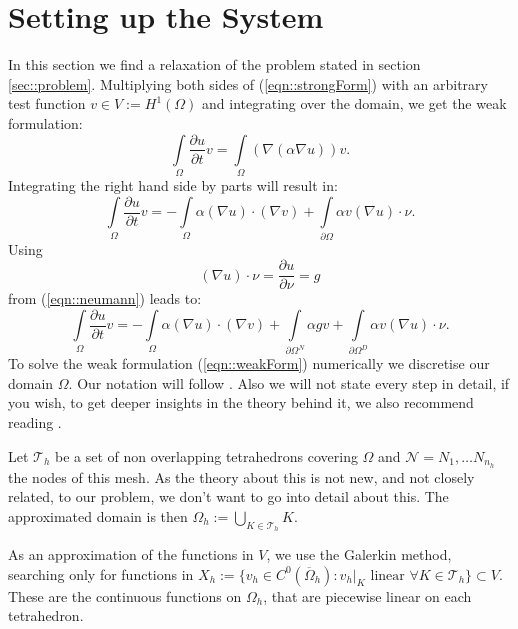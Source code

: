 
\section{\label{sec::setupSystem}Setting up the System}
In this section we find a relaxation of the problem stated in section \ref{sec::problem}. Multiplying both sides of (\ref{eqn::strongForm}) with an arbitrary test function $v\in V:=H^1(\Omega)$ and integrating over the domain, we get the weak formulation:
\begin{equation*}
        \int\limits_{\Omega} \frac{\partial u}{\partial t} v = \int\limits_{\Omega} (\nabla(\alpha\nabla u)) v.
\end{equation*}
Integrating the right hand side by parts will result in:
\begin{equation*}
        \int\limits_{\Omega} \frac{\partial u}{\partial t} v = -\int\limits_{\Omega} \alpha(\nabla u) \cdot (\nabla v) + \int\limits_{\partial \Omega} \alpha v (\nabla u) \cdot \nu.
\end{equation*}
Using
\begin{equation*}
        (\nabla u)\cdot \nu = \frac{\partial u}{\partial \nu} = g
\end{equation*}
from (\ref{eqn::neumann}) leads to:
\begin{equation}
        \label{eqn::weakForm}
        \int\limits_{\Omega} \frac{\partial u}{\partial t} v = -\int\limits_{\Omega} \alpha(\nabla u) \cdot (\nabla v) +  \int\limits_{\partial\Omega^N} \alpha gv + \int\limits_{\partial \Omega^D} \alpha v (\nabla u) \cdot \nu.
\end{equation}
To solve the weak formulation (\ref{eqn::weakForm}) numerically we discretise our domain $\Omega$. Our notation will follow \cite{quarteroni2009numerical}. Also we will not state every step in detail, if you wish, to get deeper insights in the theory behind it, we also recommend reading \cite{quarteroni2009numerical}.

Let $\mathcal{T}_h$ be a set of non overlapping tetrahedrons covering $\Omega$ and $\mathcal{N}={N_1,\dots N_{n_h}}$ the nodes of this mesh. As the theory about this is not new, and not closely related, to our problem, we don't want to go into detail about this. The approximated domain is then $\Omega_h:=\bigcup_{K\in\mathcal{T}_h}K$.

As an approximation of the functions in $V$, we use the Galerkin method, searching only for functions in $X_h:=\{v_h\in C^0(\overline{\Omega}_h) : v_h|_K \text{ linear } \forall K\in \mathcal{T}_h\}\subset V$. These are the continuous functions on $\Omega_h$, that are piecewise linear on each tetrahedron.

